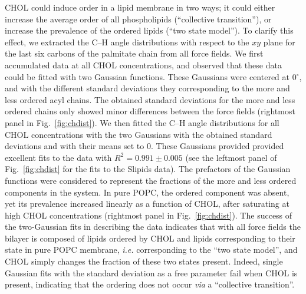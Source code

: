 \documentclass[journal=jctcce]{achemso}
\begin{document}
CHOL could induce order in a lipid membrane in two ways; it could either increase the average order of all phospholipids (``collective transition''), or increase the prevalence of the ordered lipids (``two state model''). To clarify this effect, we extracted the C--H angle distributions with respect to the $xy$ plane for the last six carbons of the palmitate chain from all force fields. We first accumulated data at all CHOL concentrations, and observed that these data could be fitted with two Gaussian functions. These Gaussians were centered at 0$^\circ$, and with the different standard deviations they corresponding to the more and less ordered acyl chains. The obtained standard deviations for the more and less ordered chains only showed minor differences between the force fields (rightmost panel in Fig.~\ref{fig:chdist}). We then fitted the C--H angle distributions for all CHOL concentrations with the two Gaussians with the obtained standard deviations and with their means set to 0. These Gaussians provided provided excellent fits to the data with $R^2=0.991\pm 0.005$ (see the leftmost panel of Fig.~\ref{fig:chdist} for the fits to the Slipids data). The prefactors of the Gaussian functions were considered to represent the fractions of the more and less ordered components in the system. In pure POPC, the ordered component was absent, yet its prevalence increased linearly as a function of CHOL, after saturating at high CHOL concentrations (rightmost panel in Fig.~\ref{fig:chdist}). The success of the two-Gaussian fits in describing the data indicates that with all force fields the bilayer is composed of lipids ordered by CHOL and lipids corresponding to their state in pure POPC membrane, \textit{i.e.} corresponding to the ``two state model'', and CHOL simply changes the fraction of these two states present. Indeed, single Gaussian fits with the standard deviation as a free parameter fail when CHOL is present, indicating that the ordering does not occur \textit{via} a ``collective transition''.
\end{document}
